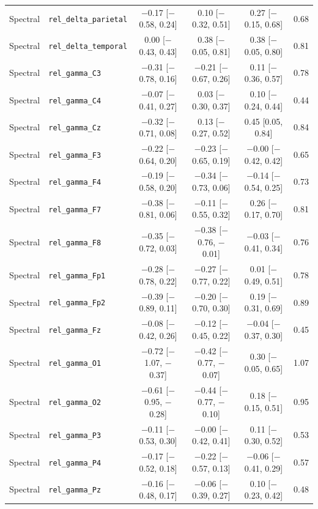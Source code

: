 {\begin{longtable}{llcccc}
Spectral & \texttt{rel\_delta\_parietal} & $-$0.17 [$-$0.58, 0.24] & 0.10 [$-$0.32, 0.51] & 0.27 [$-$0.15, 0.68] & 0.68 \\
Spectral & \texttt{rel\_delta\_temporal} & 0.00 [$-$0.43, 0.43] & 0.38 [$-$0.05, 0.81] & 0.38 [$-$0.05, 0.80] & 0.81 \\
Spectral & \texttt{rel\_gamma\_C3} & $-$0.31 [$-$0.78, 0.16] & $-$0.21 [$-$0.67, 0.26] & 0.11 [$-$0.36, 0.57] & 0.78 \\
Spectral & \texttt{rel\_gamma\_C4} & $-$0.07 [$-$0.41, 0.27] & 0.03 [$-$0.30, 0.37] & 0.10 [$-$0.24, 0.44] & 0.44 \\
Spectral & \texttt{rel\_gamma\_Cz} & $-$0.32 [$-$0.71, 0.08] & 0.13 [$-$0.27, 0.52] & 0.45 [0.05, 0.84] & 0.84 \\
Spectral & \texttt{rel\_gamma\_F3} & $-$0.22 [$-$0.64, 0.20] & $-$0.23 [$-$0.65, 0.19] & $-$0.00 [$-$0.42, 0.42] & 0.65 \\
Spectral & \texttt{rel\_gamma\_F4} & $-$0.19 [$-$0.58, 0.20] & $-$0.34 [$-$0.73, 0.06] & $-$0.14 [$-$0.54, 0.25] & 0.73 \\
Spectral & \texttt{rel\_gamma\_F7} & $-$0.38 [$-$0.81, 0.06] & $-$0.11 [$-$0.55, 0.32] & 0.26 [$-$0.17, 0.70] & 0.81 \\
Spectral & \texttt{rel\_gamma\_F8} & $-$0.35 [$-$0.72, 0.03] & $-$0.38 [$-$0.76, $-$0.01] & $-$0.03 [$-$0.41, 0.34] & 0.76 \\
Spectral & \texttt{rel\_gamma\_Fp1} & $-$0.28 [$-$0.78, 0.22] & $-$0.27 [$-$0.77, 0.22] & 0.01 [$-$0.49, 0.51] & 0.78 \\
Spectral & \texttt{rel\_gamma\_Fp2} & $-$0.39 [$-$0.89, 0.11] & $-$0.20 [$-$0.70, 0.30] & 0.19 [$-$0.31, 0.69] & 0.89 \\
Spectral & \texttt{rel\_gamma\_Fz} & $-$0.08 [$-$0.42, 0.26] & $-$0.12 [$-$0.45, 0.22] & $-$0.04 [$-$0.37, 0.30] & 0.45 \\
Spectral & \texttt{rel\_gamma\_O1} & $-$0.72 [$-$1.07, $-$0.37] & $-$0.42 [$-$0.77, $-$0.07] & 0.30 [$-$0.05, 0.65] & 1.07 \\
Spectral & \texttt{rel\_gamma\_O2} & $-$0.61 [$-$0.95, $-$0.28] & $-$0.44 [$-$0.77, $-$0.10] & 0.18 [$-$0.15, 0.51] & 0.95 \\
Spectral & \texttt{rel\_gamma\_P3} & $-$0.11 [$-$0.53, 0.30] & $-$0.00 [$-$0.42, 0.41] & 0.11 [$-$0.30, 0.52] & 0.53 \\
Spectral & \texttt{rel\_gamma\_P4} & $-$0.17 [$-$0.52, 0.18] & $-$0.22 [$-$0.57, 0.13] & $-$0.06 [$-$0.41, 0.29] & 0.57 \\
Spectral & \texttt{rel\_gamma\_Pz} & $-$0.16 [$-$0.48, 0.17] & $-$0.06 [$-$0.39, 0.27] & 0.10 [$-$0.23, 0.42] & 0.48 \\

\end{longtable}}
